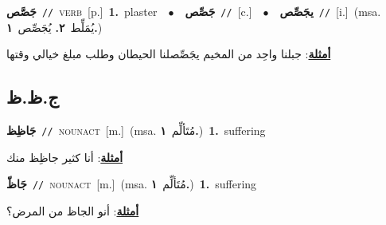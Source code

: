 \documentclass[10pt,a4paper,twoside]{article} %
\begin{document}
\begin{multicols}{2}
{\setlength\topsep{0pt}\textbf{\foreignlanguage{arabic}{جَصَّص}}\ {\color{gray}\texttt{//}\color{black}}\ \textsc{verb}\ [p.]\ \textbf{1.}~plaster\ \ $\bullet$\ \ \setlength\topsep{0pt}\textbf{\foreignlanguage{arabic}{جَصِّص}}\ {\color{gray}\texttt{//}\color{black}}\ [c.]\ \ $\bullet$\ \ \setlength\topsep{0pt}\textbf{\foreignlanguage{arabic}{يجَصِّص}}\ {\color{gray}\texttt{//}\color{black}}\ [i.]\ \color{gray}(msa. \foreignlanguage{arabic}{يُمَلِّط}~\foreignlanguage{arabic}{\textbf{٢.}}  \foreignlanguage{arabic}{يُجَصِّص}~\foreignlanguage{arabic}{\textbf{١.}})\color{black}\  \begin{flushright}\color{gray}\foreignlanguage{arabic}{\textbf{\underline{\foreignlanguage{arabic}{أمثلة}}}: جبلنا واحِد من المخيم يجَصِّصلنا الحيطان وطلب مبلغ خيالي وقتها}\end{flushright}\color{black}} \vspace{2mm}

\vspace{-3mm}
\subsection*{\color{blue}\foreignlanguage{arabic}{ج.ظ.ظ}\color{blue}{}} 

{\setlength\topsep{0pt}\textbf{\foreignlanguage{arabic}{جَاظِظ}}\ {\color{gray}\texttt{//}\color{black}}\ \textsc{noun\textunderscore act}\ [m.]\ \color{gray}(msa. \foreignlanguage{arabic}{مُتَألِّم}~\foreignlanguage{arabic}{\textbf{١.}})\color{black}\ \textbf{1.}~suffering\  \begin{flushright}\color{gray}\foreignlanguage{arabic}{\textbf{\underline{\foreignlanguage{arabic}{أمثلة}}}: أنا كثير جاظِظ منك}\end{flushright}\color{black}} \vspace{2mm}

{\setlength\topsep{0pt}\textbf{\foreignlanguage{arabic}{جَاظّ}}\ {\color{gray}\texttt{//}\color{black}}\ \textsc{noun\textunderscore act}\ [m.]\ \color{gray}(msa. \foreignlanguage{arabic}{مُتَألِّم}~\foreignlanguage{arabic}{\textbf{١.}})\color{black}\ \textbf{1.}~suffering\  \begin{flushright}\color{gray}\foreignlanguage{arabic}{\textbf{\underline{\foreignlanguage{arabic}{أمثلة}}}: أنو الجاظ من المرض؟}\end{flushright}\color{black}} \vspace{2mm}


\end{multicols}
\end{document}
